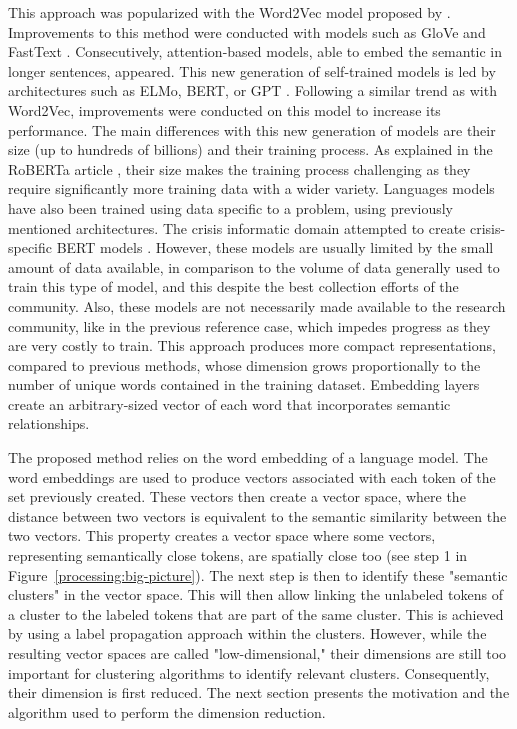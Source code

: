 This approach was popularized with the Word2Vec model proposed by \textcite{mikolovDistributedRepresentationsWords2013}.
Improvements to this method were conducted with models such as GloVe and FastText \parencite{bojanowskiEnrichingWordVectors2016,penningtonGloveGlobalVectors2014}.
Consecutively, attention-based models, able to embed the semantic in longer sentences, appeared.
This new generation of self-trained models is led by architectures such as ELMo, BERT, or GPT \parencite{devlinBERTPretrainingDeep2018,petersDeepContextualizedWord2018}.
Following a similar trend as with Word2Vec, improvements were conducted on this model to increase its performance.
The main differences with this new generation of models are their size (up to hundreds of billions) and their training process.
As explained in the RoBERTa article \parencite{liuRoBERTaRobustlyOptimized2019}, their size makes the training process challenging as they require significantly more training data with a wider variety.
Languages models have also been trained using data specific to a problem, using previously mentioned architectures.
The crisis informatic domain attempted to create crisis-specific BERT models \parencite{liuCrisisBERTRobustTransformer2021}.
However, these models are usually limited by the small amount of data available, in comparison to the volume of data generally used to train this type of model, and this despite the best
collection efforts of the community.
Also, these models are not necessarily made available to the research community, like in the previous reference case, which impedes progress as they are very costly to train.
This approach produces more compact representations, compared to previous methods, whose dimension grows proportionally to the number of unique words contained in the training dataset.
Embedding layers create an arbitrary-sized vector of each word that incorporates semantic relationships.

The proposed method relies on the word embedding of a language model.
The word embeddings are used to produce vectors associated with each token of the set previously created.
These vectors then create a vector space, where the distance between two vectors is equivalent to the semantic similarity between the two vectors.
This property creates a vector space where some vectors, representing semantically close tokens, are spatially close too (see step 1 in Figure~\ref{processing:big-picture}).
The next step is then to identify these "semantic clusters" in the vector space.
This will then allow linking the unlabeled tokens of a cluster to the labeled tokens that are part of the same cluster.
This is achieved by using a label propagation approach within the clusters.
However, while the resulting vector spaces are called "low-dimensional," their dimensions are still too important for clustering algorithms to identify relevant clusters.
Consequently, their dimension is first reduced.
The next section presents the motivation and the algorithm used to perform the dimension reduction.

